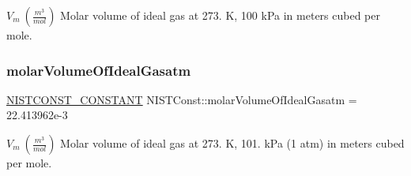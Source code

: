 $V_m \ (\frac{m^3}{mol})$ Molar volume of ideal gas at 273. K, 100 k\+Pa in meters cubed per mole. \mbox{\label{group___n_i_s_t_const-_molar_volume_gabc17d301cfbbfc12ffc1caa75c4a4602}} 
\subsubsection{\texorpdfstring{molar\+Volume\+Of\+Ideal\+Gasatm}{molarVolumeOfIdealGasatm}}
{\footnotesize\ttfamily \mbox{\hyperlink{group___n_i_s_t_const-_macros_ga2b0fc1d7452373f816175dd86ce26729}{N\+I\+S\+T\+C\+O\+N\+S\+T\+\_\+\+C\+O\+N\+S\+T\+A\+NT}} N\+I\+S\+T\+Const\+::molar\+Volume\+Of\+Ideal\+Gasatm = 22.\+413962e-\/3}

$V_m \ (\frac{m^3}{mol})$ Molar volume of ideal gas at 273. K, 101. k\+Pa (1 atm) in meters cubed per mole. 